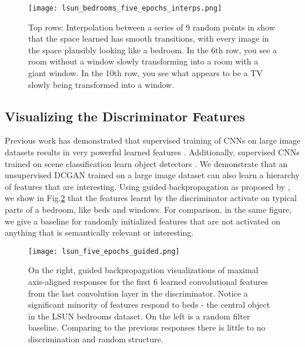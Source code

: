 \documentclass{article} \usepackage{iclr2016_conference,times}
\begin{document}
\begin{figure}[h!]
\begin{center}
\texttt{[image: lsun\_bedrooms\_five\_epochs\_interps.png]}
\end{center}
\caption{\label{fig_LSUN_interp}Top rows: Interpolation between a series of 9 random points in  show that the space learned has smooth transitions, with every image in the space plausibly looking like a bedroom. In the 6th row, you see a room without a window slowly transforming into a room with a giant window. In the 10th row, you see what appears to be a TV slowly being transformed into a window. }
\end{figure}

\subsection{Visualizing the Discriminator Features}

Previous work has demonstrated that supervised training of CNNs on large image datasets results in very powerful learned features \citep{zeiler2014visualizing}.  Additionally, supervised CNNs trained on scene classification learn object detectors \citep{Oquab14}. We demonstrate that an unsupervised DCGAN trained on a large image dataset can also learn a hierarchy of features that are interesting.
Using guided backpropagation as proposed by \citep{springenberg2014striving}, we show in Fig.\ref{fig_LSUN_guidedbp_trained} that the features learnt by the discriminator activate on typical parts of a bedroom, like beds and windows. For comparison, in the same figure, we give a baseline for randomly initialized features that are not activated on anything that is semantically relevant or interesting.

\begin{figure}[h!]
\begin{center}
\texttt{[image: lsun\_five\_epochs\_guided.png]}
\end{center}

\caption{\label{fig_LSUN_guidedbp_trained}On the right, guided backpropagation visualizations of maximal axis-aligned responses for the first 6 learned convolutional features from the last convolution layer in the discriminator. Notice a significant minority of features respond to beds - the central object in the LSUN bedrooms dataset. On the left is a random filter baseline. Comparing to the previous responses there is little to no discrimination and random structure.}
\end{figure}
\end{document}
